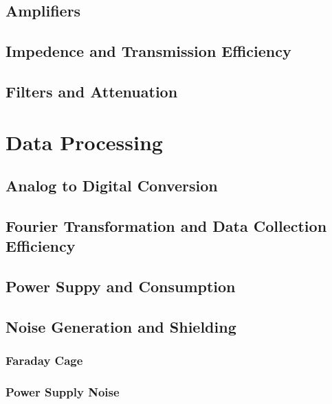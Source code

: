 \subsection{Amplifiers}

\subsection{Impedence and Transmission Efficiency}

\subsection{Filters and Attenuation}

\section{Data Processing}

\subsection{Analog to Digital Conversion}

\subsection{Fourier Transformation and Data Collection Efficiency}

\subsection{Power Suppy and Consumption}

\subsection{Noise Generation and Shielding}

\subsubsection{Faraday Cage}

\subsubsection{Power Supply Noise}

